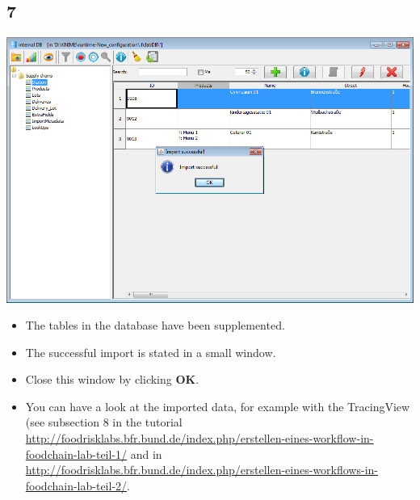 \documentclass{beamer}
\begin{document}
\subsection{7}
\begin{frame}
	\begin{center}
  		\includegraphics[height=0.6\textheight]{7.png}
	\end{center}
	\begin{itemize}
		\item The tables in the database have been supplemented.
		\item The successful import is stated in a small window.
        \item Close this window by clicking \textbf{OK}.
        \item You can have a look at the imported data, for example with the TracingView (see subsection 8 in the tutorial \url{http://foodrisklabs.bfr.bund.de/index.php/erstellen-eines-workflow-in-foodchain-lab-teil-1/} and in \url{http://foodrisklabs.bfr.bund.de/index.php/erstellen-eines-workflows-in-foodchain-lab-teil-2/}.
	\end{itemize}
\end{frame}
\end{document}
